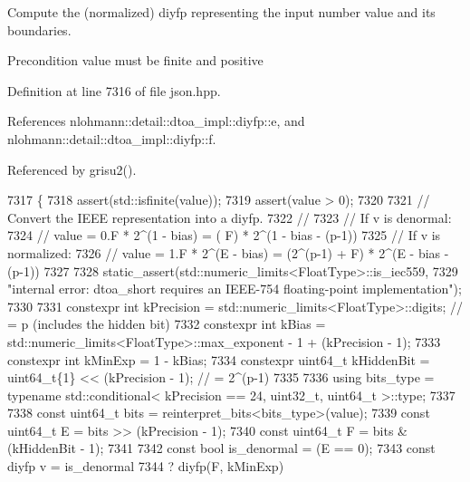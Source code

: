 Compute the (normalized) diyfp representing the input number \textquotesingle{}value\textquotesingle{} and its boundaries.

\begin{DoxyPrecond}{Precondition}
value must be finite and positive 
\end{DoxyPrecond}


Definition at line 7316 of file json.\+hpp.



References nlohmann\+::detail\+::dtoa\+\_\+impl\+::diyfp\+::e, and nlohmann\+::detail\+::dtoa\+\_\+impl\+::diyfp\+::f.



Referenced by grisu2().


\begin{DoxyCode}
7317 \{
7318     assert(std::isfinite(value));
7319     assert(value > 0);
7320 
7321     \textcolor{comment}{// Convert the IEEE representation into a diyfp.}
7322     \textcolor{comment}{//}
7323     \textcolor{comment}{// If v is denormal:}
7324     \textcolor{comment}{//      value = 0.F * 2^(1 - bias) = (          F) * 2^(1 - bias - (p-1))}
7325     \textcolor{comment}{// If v is normalized:}
7326     \textcolor{comment}{//      value = 1.F * 2^(E - bias) = (2^(p-1) + F) * 2^(E - bias - (p-1))}
7327 
7328     static\_assert(std::numeric\_limits<FloatType>::is\_iec559,
7329                   \textcolor{stringliteral}{"internal error: dtoa\_short requires an IEEE-754 floating-point implementation"});
7330 
7331     constexpr \textcolor{keywordtype}{int}      kPrecision = std::numeric\_limits<FloatType>::digits; \textcolor{comment}{// = p (includes the hidden
       bit)}
7332     constexpr \textcolor{keywordtype}{int}      kBias      = std::numeric\_limits<FloatType>::max\_exponent - 1 + (kPrecision - 1);
7333     constexpr \textcolor{keywordtype}{int}      kMinExp    = 1 - kBias;
7334     constexpr uint64\_t kHiddenBit = uint64\_t\{1\} << (kPrecision - 1); \textcolor{comment}{// = 2^(p-1)}
7335 
7336     \textcolor{keyword}{using} bits\_type = \textcolor{keyword}{typename} std::conditional< kPrecision == 24, uint32\_t, uint64\_t >::type;
7337 
7338     \textcolor{keyword}{const} uint64\_t bits = reinterpret\_bits<bits\_type>(value);
7339     \textcolor{keyword}{const} uint64\_t E = bits >> (kPrecision - 1);
7340     \textcolor{keyword}{const} uint64\_t F = bits & (kHiddenBit - 1);
7341 
7342     \textcolor{keyword}{const} \textcolor{keywordtype}{bool} is\_denormal = (E == 0);
7343     \textcolor{keyword}{const} diyfp v = is\_denormal
7344                     ? diyfp(F, kMinExp)

\end{DoxyCode}
